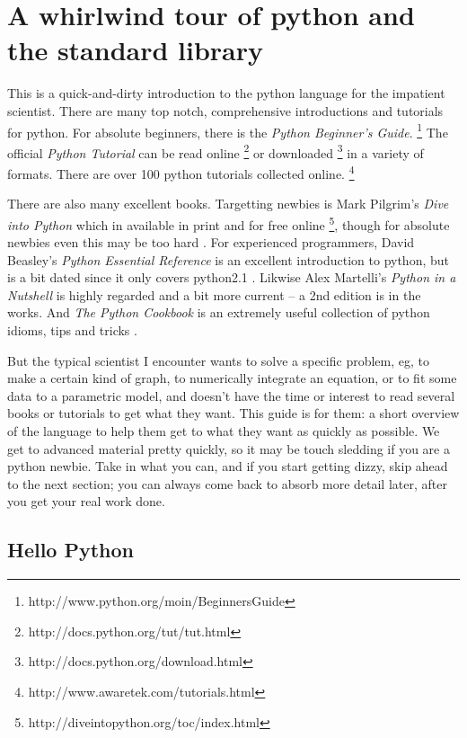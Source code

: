 
\chapter[Python intro]{A whirlwind tour of python and the standard library}

This is a quick-and-dirty introduction to the python language for
the impatient scientist. There are many top notch, comprehensive introductions
and tutorials for python. For absolute beginners, there is the \textit{Python
Beginner's Guide}.%
\footnote{http://www.python.org/moin/BeginnersGuide%
} The official \textit{Python Tutorial} can be read online%
\footnote{http://docs.python.org/tut/tut.html%
} or downloaded%
\footnote{http://docs.python.org/download.html%
} in a variety of formats. There are over 100 python tutorials collected
online.%
\footnote{http://www.awaretek.com/tutorials.html%
}

There are also many excellent books. Targetting newbies is Mark Pilgrim's
\textit{Dive into Python} which in available in print and for free
online%
\footnote{http://diveintopython.org/toc/index.html%
}, though for absolute newbies even this may be too hard \cite{Dive}.
For experienced programmers, David Beasley's \textit{Python Essential
Reference} is an excellent introduction to python, but is a bit dated
since it only covers python2.1 \cite{Beasley}. Likwise Alex Martelli's
\textit{Python in a Nutshell} is highly regarded and a bit more current
-- a 2nd edition is in the works\cite{Nutshell}. And \textit{The
Python Cookbook} is an extremely useful collection of python idioms,
tips and tricks \cite{Cookbook}.

But the typical scientist I encounter wants to solve a specific problem,
eg, to make a certain kind of graph, to numerically integrate an equation,
or to fit some data to a parametric model, and doesn't have the time
or interest to read several books or tutorials to get what they want.
This guide is for them: a short overview of the language to help them
get to what they want as quickly as possible. We get to advanced material
pretty quickly, so it may be touch sledding if you are a python newbie.
Take in what you can, and if you start getting dizzy, skip ahead to
the next section; you can always come back to absorb more detail later,
after you get your real work done.


\section{Hello Python}

